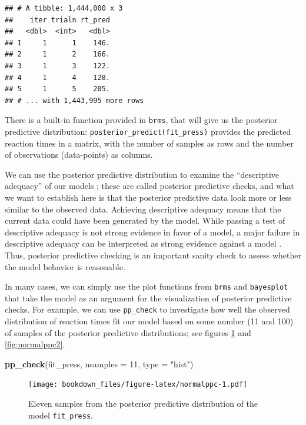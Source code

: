 \documentclass[12pt,]{krantz}
\newenvironment{Shaded}{\begin{snugshade}}{\end{snugshade}}
\newcommand{\DataTypeTok}[1]{\textcolor[rgb]{0.13,0.29,0.53}{#1}}
\newcommand{\DecValTok}[1]{\textcolor[rgb]{0.00,0.00,0.81}{#1}}
\newcommand{\KeywordTok}[1]{\textcolor[rgb]{0.13,0.29,0.53}{\textbf{#1}}}
\newcommand{\NormalTok}[1]{#1}
\newcommand{\StringTok}[1]{\textcolor[rgb]{0.31,0.60,0.02}{#1}}
\theoremstyle{definition}
\theoremstyle{definition}
\theoremstyle{definition}
\theoremstyle{remark}
\begin{document}
\begin{verbatim}
## # A tibble: 1,444,000 x 3
##    iter trialn rt_pred
##   <dbl>  <int>   <dbl>
## 1     1      1    146.
## 2     1      2    166.
## 3     1      3    122.
## 4     1      4    128.
## 5     1      5    205.
## # ... with 1,443,995 more rows
\end{verbatim}

There is a built-in function provided in \texttt{brms}, that will give us the posterior predictive distribution: \texttt{posterior\_predict(fit\_press)} provides the predicted reaction times in a matrix, with the number of samples as rows and the number of observations (data-points) as columns.

We can use the posterior predictive distribution to examine the ``descriptive adequacy'' of our models \citetext{\citealp[Chapter 6]{Gelman14}; \citealp{shiffrinSurveyModelEvaluation2008}}; these are called posterior predictive checks, and what we want to establish here is that the posterior predictive data look more or less similar to the observed data. Achieving descriptive adequacy means that the current data could have been generated by the model. While passing a test of descriptive adequacy is not strong evidence in favor of a model, a major failure in descriptive adequacy can be interpreted as strong evidence against a model \citep{shiffrinSurveyModelEvaluation2008}. Thus, posterior predictive checking is an important sanity check to assess whether the model behavior is reasonable.

In many cases, we can simply use the plot functions from \texttt{brms} and \texttt{bayesplot} that take the model as an argument for the visualization of posterior predictive checks. For example, we can use \texttt{pp\_check} to investigate how well the observed distribution of reaction times fit our model based on some number (11 and 100) of samples of the posterior predictive distributions; see figures \ref{fig:normalppc} and \ref{fig:normalppc2}.



\begin{Shaded}
\begin{Highlighting}[]
\KeywordTok{pp_check}\NormalTok{(fit_press, }\DataTypeTok{nsamples =} \DecValTok{11}\NormalTok{, }\DataTypeTok{type =} \StringTok{"hist"}\NormalTok{)}
\end{Highlighting}
\end{Shaded}

\begin{figure}
\centering
\texttt{[image: bookdown\_files/figure-latex/normalppc-1.pdf]}
\caption{\label{fig:normalppc}Eleven samples from the posterior predictive distribution of the model \texttt{fit\_press}.}
\end{figure}
\end{document}
